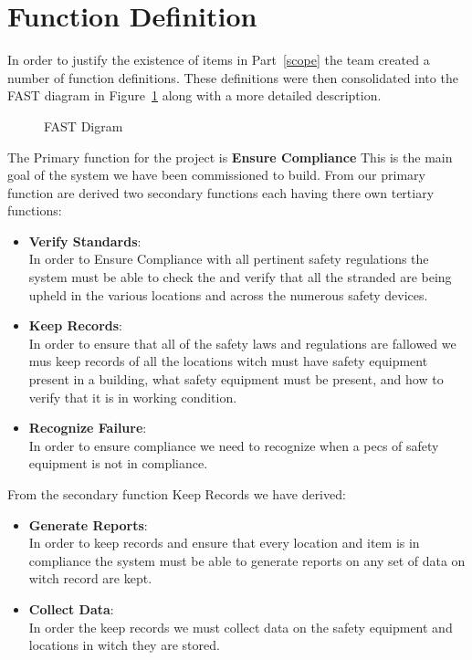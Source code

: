 \documentclass[Letter,11pt]{article}
\begin{document}
\section{Function Definition} 
		In order to justify the existence of items in Part~\ref{scope} the team created a number of function definitions. These definitions were then consolidated into the FAST diagram in Figure~\ref{fast1} along with a more detailed description.
				\begin{figure}[h]
					\centering
					
					\caption{\label{fast1} FAST Digram}
				\end{figure}
		The Primary function for the project is \textbf{Ensure Compliance} This is the main goal of the system we have been commissioned to build. From our primary function are derived two secondary functions each having there own tertiary functions:
		\begin{itemize}
			\item \textbf{Verify Standards}:\\
			In order to Ensure Compliance with all pertinent safety regulations the system must be able to check the and verify that all the stranded are being upheld in the various locations and across the numerous safety devices.
			\item \textbf{Keep Records}:\\
			In order to ensure that all of the safety laws and regulations are fallowed we mus keep records of all the locations witch must have safety equipment present in a building, what safety equipment must be present, and how to verify that it is in working condition.  
			\item \textbf{Recognize Failure}:\\
			In order to ensure compliance we need to recognize when a pecs of safety equipment is not in compliance. 
		\end{itemize}
		From the secondary function Keep Records we have derived: 
		\begin{itemize}
			\item \textbf{Generate Reports}:\\
			In order to keep records and ensure that every location and item is in compliance the system must be able to generate reports on any set of data on witch record are kept.
			\item \textbf{Collect Data}:\\
			In order the keep records we must collect data on the safety equipment and locations in witch they are stored.
		\end{itemize}
\end{document}
